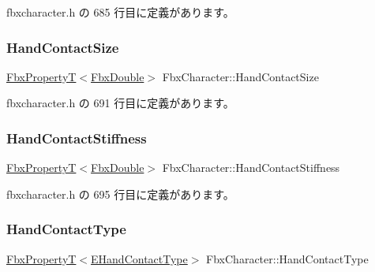  fbxcharacter.\+h の 685 行目に定義があります。

\mbox{\label{class_fbx_character_ae54641c1886b9a7fdd7761804a868454}} 
\subsubsection{\texorpdfstring{Hand\+Contact\+Size}{HandContactSize}}
{\footnotesize\ttfamily \hyperlink{class_fbx_property_t}{Fbx\+PropertyT}$<$\hyperlink{fbxtypes_8h_a171e72a1c46fc15c1a6c9c31948c1c5b}{Fbx\+Double}$>$ Fbx\+Character\+::\+Hand\+Contact\+Size}



 fbxcharacter.\+h の 691 行目に定義があります。

\mbox{\label{class_fbx_character_a0673e6c72f7ba48be94bf9cac8421fab}} 
\subsubsection{\texorpdfstring{Hand\+Contact\+Stiffness}{HandContactStiffness}}
{\footnotesize\ttfamily \hyperlink{class_fbx_property_t}{Fbx\+PropertyT}$<$\hyperlink{fbxtypes_8h_a171e72a1c46fc15c1a6c9c31948c1c5b}{Fbx\+Double}$>$ Fbx\+Character\+::\+Hand\+Contact\+Stiffness}



 fbxcharacter.\+h の 695 行目に定義があります。

\mbox{\label{class_fbx_character_af0af2decb9d4fcc0cfbe59c077719343}} 
\subsubsection{\texorpdfstring{Hand\+Contact\+Type}{HandContactType}}
{\footnotesize\ttfamily \hyperlink{class_fbx_property_t}{Fbx\+PropertyT}$<$\hyperlink{class_fbx_character_a37c46ee42910cc3209e925bc4c7361f4}{E\+Hand\+Contact\+Type}$>$ Fbx\+Character\+::\+Hand\+Contact\+Type}



